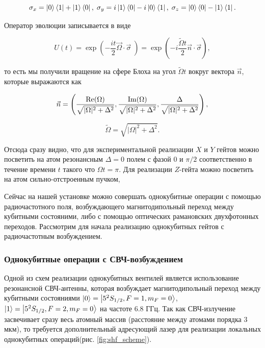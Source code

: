\begin{equation}
	\sigma_x = \left| 0 \right\rangle\left\langle 1 \right| + \left| 1 \right\rangle\left\langle 0 \right|, \; \sigma_y = i\left| 1 \right\rangle\left\langle 0 \right| - i\left| 0 \right\rangle\left\langle 1 \right|, \; \sigma_z = \left| 0 \right\rangle\left\langle 0 \right|-\left| 1 \right\rangle\left\langle 1 \right|.
\end{equation}

Оператор эволюции записывается в виде 

\begin{equation}
	U(t) = \exp\left(-\frac{it}{2}\vec{\Omega}\cdot\vec{\sigma}\;\right) = \exp\left(-i\frac{\tilde{\Omega}t}{2}\vec{n}\cdot\vec{\sigma}\right),
	\label{eq:evolution_operator}
\end{equation}

то есть мы получили вращение на сфере Блоха на угол $\tilde{\Omega}t$ вокруг вектора $\vec{n}$, которые выражаются как

\begin{equation}
	\vec{n}=\left(\frac{\rm{Re(\Omega)}}{\sqrt{|\Omega|^2 + \Delta^2}},\frac{\rm{Im}(\Omega)}{\sqrt{|\Omega|^2 + \Delta^2}},\frac{\Delta}{\sqrt{|\Omega|^2 + \Delta^2}}\right),
\end{equation}

\begin{equation}
	\tilde{\Omega} = \sqrt{|\Omega|^2 + \Delta^2}.
\end{equation}

Отсюда сразу видно, что для экспериментальной реализации $X$ и $Y$ гейтов можно посветить на атом резонансным $\Delta = 0$ полем с фазой $0$ и $\pi/2$ соответственно в течение времени $t$ такого что $\Omega t = \pi$. Для реализации $Z$-гейта можно посветить на атом сильно-отстроенным пучком, 

Сейчас на нашей установке можно совершать однокубитные операции с помощью радиочастотного поля, возбуждающего магнитодипольный переход между кубитными состояними, либо с помощью оптических рамановских двухфотонных переходов. Рассмотрим для начала реализацию однокубитных гейтов с радиочастотным возбуждением.

\subsubsection{Однокубитные операции с СВЧ-возбуждением}

Одной из схем реализации однокубитных вентилей является использование резонансной СВЧ-антенны, которая возбуждает магнитодипольный переход между кубитными состояниями $\left| 0 \right\rangle=\left| 5^2S_{1/2},F=1,m_F=0 \right\rangle$, $\left| 1 \right\rangle=\left| 5^2S_{1/2},F=2,m_F=0 \right\rangle$ на частоте $6.8 \text{ ГГц}$. Так как СВЧ-излучение засвечивает сразу весь атомный массив (расстояние между атомами порядка $3$ мкм), то требуется дополнительный адресующий лазер для реализации локальных однокубитных операций(рис. \ref{fig:shf_scheme}). 

